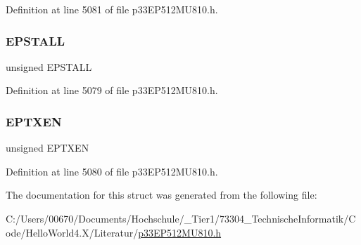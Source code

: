 Definition at line 5081 of file p33\+E\+P512\+M\+U810.\+h.

\mbox{\label{structtag_u1_e_p4_b_i_t_s_a47042104f04ebe06a23f9789bd400d7e}} 
\subsubsection{\texorpdfstring{E\+P\+S\+T\+A\+LL}{EPSTALL}}
{\footnotesize\ttfamily unsigned E\+P\+S\+T\+A\+LL}



Definition at line 5079 of file p33\+E\+P512\+M\+U810.\+h.

\mbox{\label{structtag_u1_e_p4_b_i_t_s_aa2d88c1be513e759c136823c86a355b4}} 
\subsubsection{\texorpdfstring{E\+P\+T\+X\+EN}{EPTXEN}}
{\footnotesize\ttfamily unsigned E\+P\+T\+X\+EN}



Definition at line 5080 of file p33\+E\+P512\+M\+U810.\+h.



The documentation for this struct was generated from the following file\+:\begin{DoxyCompactItemize}
\item 
C\+:/\+Users/00670/\+Documents/\+Hochschule/\+\_\+\+Tier1/73304\+\_\+\+Technische\+Informatik/\+Code/\+Hello\+World4.\+X/\+Literatur/\hyperlink{p33_e_p512_m_u810_8h}{p33\+E\+P512\+M\+U810.\+h}\end{DoxyCompactItemize}
